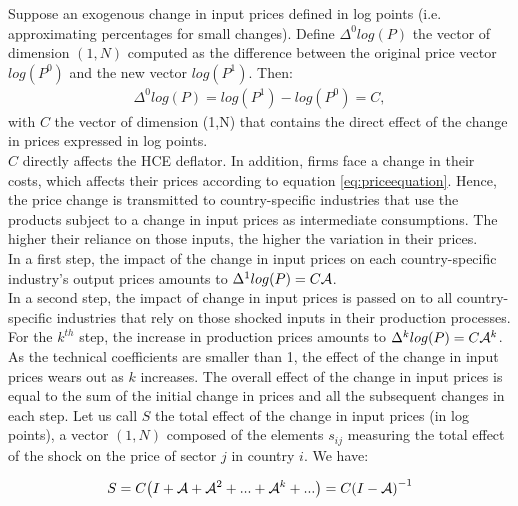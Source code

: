\documentclass[12pt,a4paper]{paper}
\begin{document}
Suppose an exogenous change in input prices defined in log points (i.e. approximating percentages for small changes). 
Define ${{\Delta }^{0}}log(P)$ the vector of dimension $(1, N)$ computed as the difference between the original price vector $log(P^0)$ and the new vector $log(P^1)$. Then:
\begin{eqnarray*}
\Delta ^0 log(P)=log(P^1)-log(P^0)=C, 
\end{eqnarray*}
with $C$ the vector of dimension (1,N) that contains the direct effect of the change in prices expressed in log points.\\
$C$ directly affects the HCE deflator.
In addition, firms face a change in their costs, which affects their prices according to equation \ref{eq:priceequation}.
Hence, the price change is transmitted to country-specific industries that use the products subject to a change in input prices as intermediate consumptions. 
The higher their reliance on those inputs, the higher the variation in their prices.\\
In a first step, the impact of the change in input prices on each country-specific industry's output prices amounts to $\Delta^{1}log(P)=C{\cal A}$.\\
In a second step, the impact of change in input prices is passed on to all country-specific industries that rely on those shocked inputs in their production processes. 
For the $k^{th}$ step, the increase in production prices amounts to $\Delta^k log(P)=C{\cal A}^k$.\\
As the technical coefficients are smaller than 1, the effect of the change in input prices wears out as $k$ increases.
The overall effect of the change in input prices is equal to the sum of the initial change in prices and all the subsequent changes in each step.
Let us call $S$ the total effect of the change in input prices (in log points), a vector $(1, N)$ composed of the elements $s_{ij}$ measuring the total effect of the shock on the price of sector $j$ in country $i$. We have: 

\begin{eqnarray}
S=C {\left( I+{\cal A}+{\cal A}^2+...+{\cal A}^k+...\right)} =C {\left( I-{\cal A} \right)}^{-1}
\label{eq:eqchocprix} 
\end{eqnarray}
\end{document}

